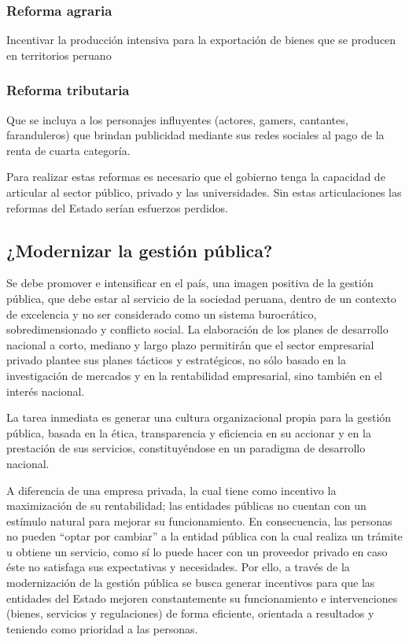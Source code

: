 \documentclass[
  jou,
  floatsintext,
  longtable,
  a4paper,
  nolmodern,
  notxfonts,
  notimes,
  colorlinks=true,linkcolor=blue,citecolor=blue,urlcolor=blue]{apa7}
\begin{document}
\subsubsection{Reforma agraria}\label{reforma-agraria}

Incentivar la producción intensiva para la exportación de bienes que se
producen en territorios peruano

\subsubsection{Reforma tributaria}\label{reforma-tributaria}

Que se incluya a los personajes influyentes (actores, gamers, cantantes,
faranduleros) que brindan publicidad mediante sus redes sociales al pago
de la renta de cuarta categoría.

Para realizar estas reformas es necesario que el gobierno tenga la
capacidad de articular al sector público, privado y las universidades.
Sin estas articulaciones las reformas del Estado serían esfuerzos
perdidos.

\subsection{¿Modernizar la gestión
pública?}\label{modernizar-la-gestiuxf3n-puxfablica}

Se debe promover e intensificar en el país, una imagen positiva de la
gestión pública, que debe estar al servicio de la sociedad peruana,
dentro de un contexto de excelencia y no ser considerado como un sistema
burocrático, sobredimensionado y conflicto social. La elaboración de los
planes de desarrollo nacional a corto, mediano y largo plazo permitirán
que el sector empresarial privado plantee sus planes tácticos y
estratégicos, no sólo basado en la investigación de mercados y en la
rentabilidad empresarial, sino también en el interés nacional.

La tarea inmediata es generar una cultura organizacional propia para la
gestión pública, basada en la ética, transparencia y eficiencia en su
accionar y en la prestación de sus servicios, constituyéndose en un
paradigma de desarrollo nacional.

A diferencia de una empresa privada, la cual tiene como incentivo la
maximización de su rentabilidad; las entidades públicas no cuentan con
un estímulo natural para mejorar su funcionamiento. En consecuencia, las
personas no pueden ``optar por cambiar'' a la entidad pública con la
cual realiza un trámite u obtiene un servicio, como sí lo puede hacer
con un proveedor privado en caso éste no satisfaga sus expectativas y
necesidades. Por ello, a través de la modernización de la gestión
pública se busca generar incentivos para que las entidades del Estado
mejoren constantemente su funcionamiento e intervenciones (bienes,
servicios y regulaciones) de forma eficiente, orientada a resultados y
teniendo como prioridad a las personas.
\end{document}
